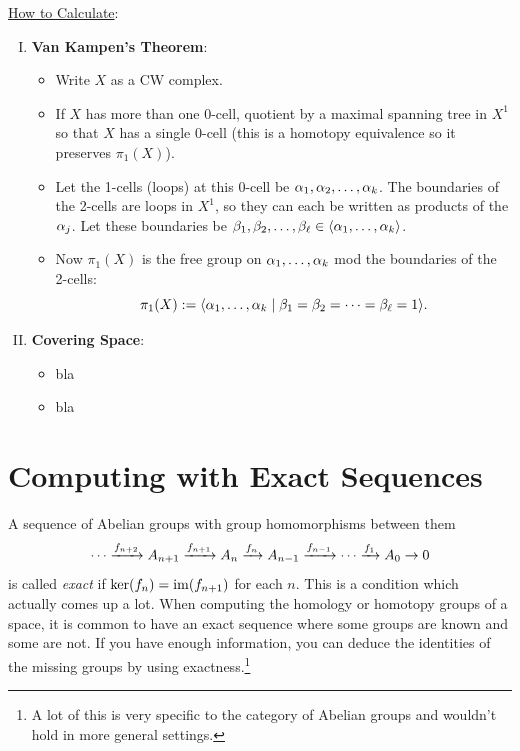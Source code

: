 \documentclass{amsart}
\begin{document}
	\underline{How to Calculate}: 
	\begin{enumerate}[(I)]
		\item \textbf{Van Kampen's Theorem}:
	\begin{itemize}
		\item Write $X$ as a CW complex.
		\item If $X$ has more than one 0-cell, quotient by a maximal spanning tree in $X^1$ so that $X$ has a single 0-cell (this is a homotopy equivalence so it preserves $\pi_1(X)$).
		\item Let the 1-cells (loops) at this 0-cell be $\alpha_1,\alpha_2,\dots,\alpha_k$. The boundaries of the 2-cells are loops in $X^1$, so they can each be written as products of the $\alpha_j$. Let these boundaries be $\beta_1,\beta_2,\dots,\beta_{\ell} \in \langle\alpha_1,\dots,\alpha_k\rangle$. 
		\item Now $\pi_1(X)$ is the free group on $\alpha_1,\dots,\alpha_k$ mod the boundaries of the 2-cells:
		$$
		\pi_1(X) := \langle\alpha_1,\dots,\alpha_k \; | \; \beta_1=\beta_2=\cdots=\beta_{\ell}=1\rangle.
		$$
	\end{itemize}
	\item \textbf{Covering Space}:
	\begin{itemize}
		\item bla
		\item bla
	\end{itemize}
	\end{enumerate}
	
	\newpage
	\section{Computing with Exact Sequences}
	
	A sequence of Abelian groups with group homomorphisms between them
	$$
	\cdots \xrightarrow{f_{n+2}} A_{n+1} \xrightarrow{f_{n+1}} A_n \xrightarrow{f_n} A_{n-1} \xrightarrow{f_{n-1}} \cdots \xrightarrow{f_1} A_0 \to 0
	$$
	is called \textit{exact} if $\ker(f_{n})=\operatorname{im}(f_{n+1})$ for each $n$. This is a condition which actually comes up a lot. When computing the homology or homotopy groups of a space, it is common to have an exact sequence where some groups are known and some are not. If you have enough information, you can deduce the identities of the missing groups by using exactness.\footnote{A lot of this is very specific to the category of Abelian groups and wouldn't hold in more general settings.}\\
	
\end{document}
